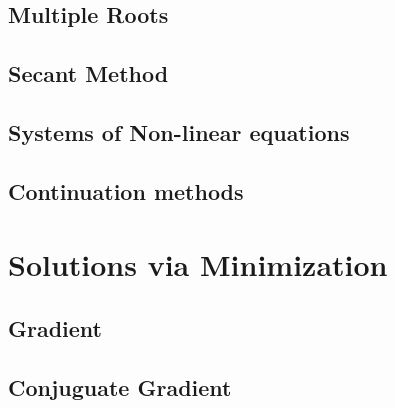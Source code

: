 \subsection{Multiple Roots}
\label{sec:multiple-roots}

\begin{frame}{}
  
\end{frame}


\subsection{Secant Method}
\label{sec:secant-method}

\begin{frame}{}
  
\end{frame}

\subsection{Systems of Non-linear equations}
\label{sec:systems-non-linear}

\begin{frame}{}
  
\end{frame}

\subsection{Continuation methods}
\label{sec:continuation-methods}

\begin{frame}{}
  
\end{frame}


\section{Solutions via Minimization}
\label{sec:solut-via-minim}

\subsection{Gradient}
\label{sec:gradient}


\begin{frame}{}
  
\end{frame}

\subsection{Conjuguate Gradient}
\label{sec:conjuguate-gradient}


